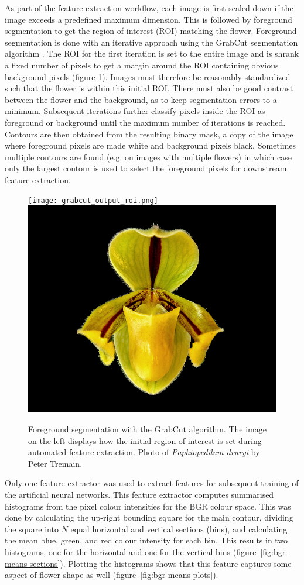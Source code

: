 \documentclass[twocolumn]{bmcart}
\begin{document}
As part of the feature extraction workflow, each image is first scaled down if the image exceeds a predefined maximum dimension. This is followed by foreground segmentation to get the region of interest (ROI) matching the flower. Foreground segmentation is done with an iterative approach using the GrabCut segmentation algorithm \cite{Rother2004}. The ROI for the first iteration is set to the entire image and is shrank a fixed number of pixels to get a margin around the ROI containing obvious background pixels (figure \ref{fig:grabcut-output}). Images must therefore be reasonably standardized such that the flower is within this initial ROI. There must also be good contrast between the flower and the background, as to keep segmentation errors to a minimum. Subsequent iterations further classify pixels inside the ROI as foreground or background until the maximum number of iterations is reached. Contours are then obtained from the resulting binary mask, a copy of the image where foreground pixels are made white and background pixels black. Sometimes multiple contours are found (e.g. on images with multiple flowers) in which case only the largest contour is used to select the foreground pixels for downstream feature extraction.

\begin{figure}[t]
    \centering
    \minipage{\textwidth}
        \texttt{[image: grabcut\_output\_roi.png]}
        \includegraphics[width=0.48\linewidth]{grabcut_output.png}
    \endminipage
    \caption{Foreground segmentation with the GrabCut algorithm. The image on the left displays how the initial region of interest is set during automated feature extraction. Photo of \textit{Paphiopedilum druryi} by Peter Tremain.}
    \label{fig:grabcut-output}
\end{figure}

Only one feature extractor was used to extract features for subsequent training of the artificial neural networks. This feature extractor computes summarised histograms from the pixel colour intensities for the BGR colour space. This was done by calculating the up-right bounding square for the main contour, dividing the square into $N$ equal horizontal and vertical sections (bins), and calculating the mean blue, green, and red colour intensity for each bin. This results in two histograms, one for the horizontal and one for the vertical bins (figure~\ref{fig:bgr-means-sections}). Plotting the histograms shows that this feature captures some aspect of flower shape as well (figure~\ref{fig:bgr-means-plots}).
\end{document}
